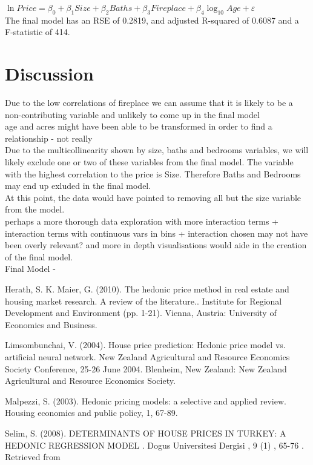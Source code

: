 \documentclass[10pt,A4,makeidx]{article}
\begin{document}
  \(\ln Price = \beta _0 + \beta _1 Size + \beta _2 Baths + \beta _3 Fireplace + \beta _4 \log_{10}Age + \varepsilon\)\\
  
  The final model has an RSE of 0.2819, and adjusted R-squared of 0.6087 and a
  F-statistic of 414.\\

\section{Discussion}
  Due to the low correlations of fireplace we can assume that it is likely to be
  a non-contributing variable and unlikely to come up in the final model\\
  

  age and acres might have been able to be transformed in order to find a relationship - not really\\

  Due to the multicollinearity shown by size, baths and bedrooms variables, we will
  likely exclude one or two of these variables from the final model. The variable
  with the highest correlation to the price is Size. Therefore Baths and Bedrooms
  may end up exluded in the final model. \\
  
  At this point, the data would have pointed to removing all but the size variable from the model.\\
  
  perhaps a more thorough data exploration with more interaction terms + interaction terms with continuous vars in bins + interaction chosen may not have been overly relevant?
  and more in depth visualisations would aide in the creation of the final model.\\
  
  Final Model - 


\begin{thebibliography}{9}
Herath, S. K. Maier, G. (2010). The hedonic price method in real estate and housing market research. A review of the literature.. Institute for Regional Development and Environment (pp. 1-21). Vienna, Austria: University of Economics and Business.

Limsombunchai, V. (2004). House price prediction: Hedonic price model vs. artificial neural network. New Zealand Agricultural and Resource Economics Society Conference, 25-26 June 2004. Blenheim, New Zealand: New Zealand Agricultural and Resource Economics Society.

Malpezzi, S. (2003). Hedonic pricing models: a selective and applied review. Housing economics and public policy, 1, 67-89.

Selim, S. (2008). DETERMINANTS OF HOUSE PRICES IN TURKEY: A HEDONIC REGRESSION MODEL . Dogus Universitesi Dergisi , 9 (1) , 65-76 . Retrieved from 
\end{thebibliography}
\end{document}
